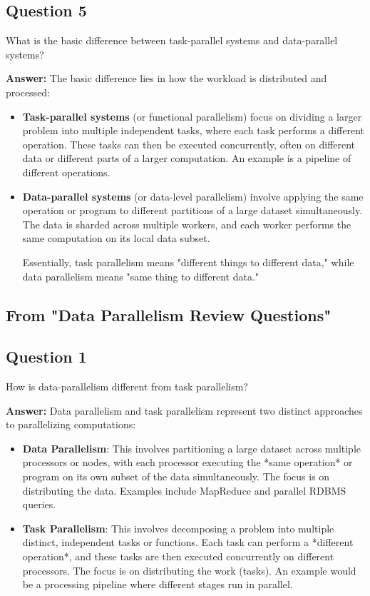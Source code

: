 \documentclass{article}
\begin{document}
\subsection*{Question 5}
What is the basic difference between task-parallel systems and data-parallel systems? 

\textbf{Answer:}
The basic difference lies in how the workload is distributed and processed:
\begin{itemize}
    \item \textbf{Task-parallel systems} (or functional parallelism) focus on dividing a larger problem into multiple independent tasks, where each task performs a different operation. These tasks can then be executed concurrently, often on different data or different parts of a larger computation. An example is a pipeline of different operations.
    \item \textbf{Data-parallel systems} (or data-level parallelism) involve applying the same operation or program to different partitions of a large dataset simultaneously. The data is sharded across multiple workers, and each worker performs the same computation on its local data subset.

Essentially, task parallelism means "different things to different data," while data parallelism means "same thing to different data."
\end{itemize}

\subsection*{From "Data Parallelism Review Questions"}

\subsection*{Question 1}
How is data-parallelism different from task parallelism? 

\textbf{Answer:}
Data parallelism and task parallelism represent two distinct approaches to parallelizing computations:
\begin{itemize}
    \item \textbf{Data Parallelism}: This involves partitioning a large dataset across multiple processors or nodes, with each processor executing the *same operation* or program on its own subset of the data simultaneously. The focus is on distributing the data. Examples include MapReduce and parallel RDBMS queries.
    \item \textbf{Task Parallelism}: This involves decomposing a problem into multiple distinct, independent tasks or functions. Each task can perform a *different operation*, and these tasks are then executed concurrently on different processors. The focus is on distributing the work (tasks). An example would be a processing pipeline where different stages run in parallel.
\end{itemize}
\end{document}
